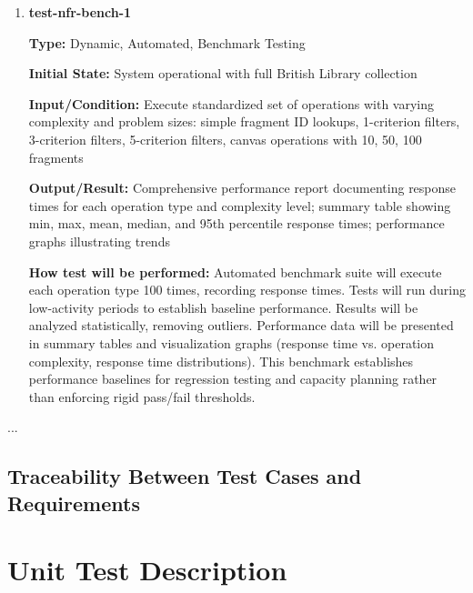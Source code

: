 \documentclass[12pt, titlepage]{article}
\begin{document}
\begin{enumerate}

\item \textbf{test-nfr-bench-1}

\textbf{Type:} Dynamic, Automated, Benchmark Testing
					
\textbf{Initial State:} System operational with full British Library collection
					
\textbf{Input/Condition:} Execute standardized set of operations with varying complexity and problem sizes: simple fragment ID lookups, 1-criterion filters, 3-criterion filters, 5-criterion filters, canvas operations with 10, 50, 100 fragments
					
\textbf{Output/Result:} Comprehensive performance report documenting response times for each operation type and complexity level; summary table showing min, max, mean, median, and 95th percentile response times; performance graphs illustrating trends
					
\textbf{How test will be performed:} Automated benchmark suite will execute each operation type 100 times, recording response times. Tests will run during low-activity periods to establish baseline performance. Results will be analyzed statistically, removing outliers. Performance data will be presented in summary tables and visualization graphs (response time vs. operation complexity, response time distributions). This benchmark establishes performance baselines for regression testing and capacity planning rather than enforcing rigid pass/fail thresholds.

\end{enumerate}

...

\subsection{Traceability Between Test Cases and Requirements}


\section{Unit Test Description}


\end{document}
